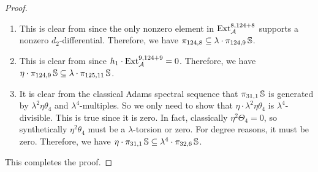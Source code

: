 \begin{proof}
\begin{enumerate}
\item This is clear from  since the only nonzero element in $\operatorname{\mathrm{Ext}}_{\operatorname{\mathcal{A}}}^{8, 124+8}$ supports a nonzero $d_2$-differential. Therefore, we have $\pi_{124, 8} \subseteq \lambda \cdot \pi_{124, 9}\operatorname{\mathbb{S}}$.\vspace{4pt}

\item This is clear from  since $h_1 \cdot \operatorname{\mathrm{Ext}}_{\operatorname{\mathcal{A}}}^{9, 124+9} = 0$. Therefore, we have $\eta \cdot \pi_{124, 9}\operatorname{\mathbb{S}} \subseteq \lambda \cdot \pi_{125, 11}\operatorname{\mathbb{S}}$.\vspace{4pt}

\item It is clear from the classical Adams spectral sequence that $\pi_{31, 1}\operatorname{\mathbb{S}}$ is generated by $\lambda^2 \eta \theta_4$ and $\lambda^4$-multiples. So we only need to show that $\eta \cdot \lambda^2 \eta \theta_4$ is $\lambda^4$-divisible. This is true since it is zero. In fact, classically $\eta^2 \Theta_4 = 0$, so synthetically $\eta^2 \theta_4$ must be a $\lambda$-torsion or zero. For degree reasons, it must be zero. Therefore, we have $\eta \cdot \pi_{31, 1}\operatorname{\mathbb{S}} \subseteq \lambda^4 \cdot \pi_{32, 6}\operatorname{\mathbb{S}}$.

\end{enumerate} 
This completes the proof.
\end{proof}


  

